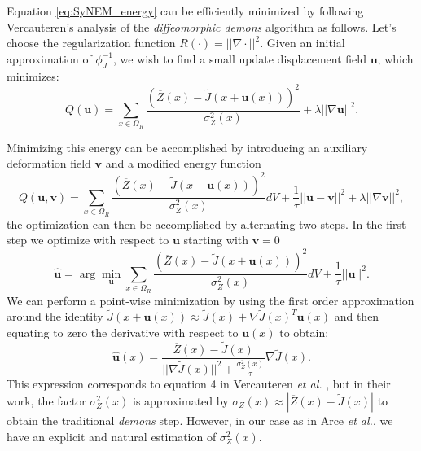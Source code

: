 Equation \ref{eq:SyNEM_energy} can be efficiently minimized by following Vercauteren's analysis of the \textit{diffeomorphic demons} algorithm \cite{Vercauteren2009} as follows. Let's choose the regularization function $R(\cdot) = ||\nabla \cdot||^{2}$. Given
an initial approximation of $\phi_{J}^{-1}$, we wish to find a small update displacement field $\mathbf{u}$, which minimizes:
\begin{equation}\label{eq:vercauteren_cost}
    Q(\mathbf{u}) = \sum_{x \in \Omega_{R}} \frac{\left(\overline{Z}(x) - \tilde{J}(x + \mathbf{u}(x))\right)^{2}}{\sigma^{2}_{Z}(x)} + \lambda ||\nabla \mathbf{u}||^{2}.
\end{equation}

Minimizing this energy can be accomplished by introducing an auxiliary deformation field $\mathbf{v}$ and a modified energy function
\begin{equation}\label{eq:vercauteren_extended_cost}
    Q(\mathbf{u}, \mathbf{v}) = \sum_{x \in \Omega_{R}} \frac{(\overline{Z}(x) - \tilde{J}(x + \mathbf{u}(x)))^{2}}{\sigma^{2}_{Z}(x)} dV + \frac{1}{\tau}||\mathbf{u}-\mathbf{v}||^{2}+\lambda ||\nabla \mathbf{v}||^{2},
\end{equation}
the optimization can then be accomplished by alternating two steps. In the first step we optimize with respect to $\mathbf{u}$ starting with $\mathbf{v} = 0$
\begin{equation}\label{eq:vercauteren_step1}
    \widehat{\mathbf{u}} = \arg\min_{\mathbf{u}}\sum_{x \in \Omega_{R}} \frac{(\overline{Z}(x) - \tilde{J}(x+\mathbf{u}(x)))^{2}}{\sigma^{2}_{Z}(x)} dV + \frac{1}{\tau} ||\mathbf{u}||^{2}.
\end{equation}
We can perform a point-wise minimization by using the first order approximation around the identity
$\tilde{J}(x+\mathbf{u}(x)) \approx \tilde{J}(x) + \nabla \tilde{J}(x)^{T}\mathbf{u}(x)$ and then equating to zero the derivative with respect to $\mathbf{u}(x)$ to obtain:
\begin{equation}\label{eq:euler_lagrange_step1}
    \widehat{\mathbf{u}}(x) = \frac{\overline{Z}(x) - \tilde{J}(x)}{||\nabla \tilde{J}(x)||^{2} + \frac{\sigma_{Z}^{2}(x)}{\tau}}\nabla \tilde{J}(x).
\end{equation}
This expression corresponds to equation 4 in Vercauteren {\it et al.} \cite{Vercauteren2009}, but in their work, the factor $\sigma_{Z}^{2}(x)$
is approximated by $\sigma_{Z}(x) \approx |\overline{Z}(x) - \tilde{J}(x)|$ to obtain the traditional {\it demons} step. However, in our case as in Arce
{\it et al.}\cite{Arce-santana2014}, we have an explicit and natural estimation of $\sigma^{2}_{Z}(x)$.\\

